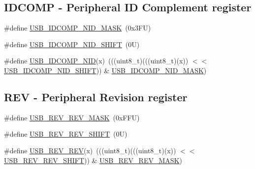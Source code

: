 \subsection*{I\+D\+C\+O\+MP -\/ Peripheral ID Complement register}
\begin{DoxyCompactItemize}
\item 
\#define \mbox{\hyperlink{group___u_s_b___register___masks_ga91e5cef0c6203ea503c01ecb0f392819}{U\+S\+B\+\_\+\+I\+D\+C\+O\+M\+P\+\_\+\+N\+I\+D\+\_\+\+M\+A\+SK}}~(0x3\+F\+U)
\item 
\#define \mbox{\hyperlink{group___u_s_b___register___masks_gabb5fe5f72dcf289ba2d624ed18f8f07a}{U\+S\+B\+\_\+\+I\+D\+C\+O\+M\+P\+\_\+\+N\+I\+D\+\_\+\+S\+H\+I\+FT}}~(0\+U)
\item 
\#define \mbox{\hyperlink{group___u_s_b___register___masks_ga00f75febd050c5d7be60f755cc502eae}{U\+S\+B\+\_\+\+I\+D\+C\+O\+M\+P\+\_\+\+N\+ID}}(x)~(((uint8\+\_\+t)(((uint8\+\_\+t)(x)) $<$$<$ \mbox{\hyperlink{group___u_s_b___register___masks_gabb5fe5f72dcf289ba2d624ed18f8f07a}{U\+S\+B\+\_\+\+I\+D\+C\+O\+M\+P\+\_\+\+N\+I\+D\+\_\+\+S\+H\+I\+FT}})) \& \mbox{\hyperlink{group___u_s_b___register___masks_ga91e5cef0c6203ea503c01ecb0f392819}{U\+S\+B\+\_\+\+I\+D\+C\+O\+M\+P\+\_\+\+N\+I\+D\+\_\+\+M\+A\+SK}})
\end{DoxyCompactItemize}
\subsection*{R\+EV -\/ Peripheral Revision register}
\begin{DoxyCompactItemize}
\item 
\#define \mbox{\hyperlink{group___u_s_b___register___masks_ga72a356a066674e41e3827b0ccb931e71}{U\+S\+B\+\_\+\+R\+E\+V\+\_\+\+R\+E\+V\+\_\+\+M\+A\+SK}}~(0x\+F\+F\+U)
\item 
\#define \mbox{\hyperlink{group___u_s_b___register___masks_gab058ebe4be52454e46ef15ce015ac5fd}{U\+S\+B\+\_\+\+R\+E\+V\+\_\+\+R\+E\+V\+\_\+\+S\+H\+I\+FT}}~(0\+U)
\item 
\#define \mbox{\hyperlink{group___u_s_b___register___masks_ga30e7698a3bfac84ce89aee7d2d0498f4}{U\+S\+B\+\_\+\+R\+E\+V\+\_\+\+R\+EV}}(x)~(((uint8\+\_\+t)(((uint8\+\_\+t)(x)) $<$$<$ \mbox{\hyperlink{group___u_s_b___register___masks_gab058ebe4be52454e46ef15ce015ac5fd}{U\+S\+B\+\_\+\+R\+E\+V\+\_\+\+R\+E\+V\+\_\+\+S\+H\+I\+FT}})) \& \mbox{\hyperlink{group___u_s_b___register___masks_ga72a356a066674e41e3827b0ccb931e71}{U\+S\+B\+\_\+\+R\+E\+V\+\_\+\+R\+E\+V\+\_\+\+M\+A\+SK}})
\end{DoxyCompactItemize}
